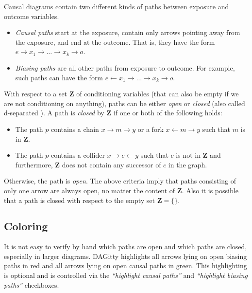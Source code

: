 \documentclass[a4paper]{article} %
\newcommand{\pp}{DAGitty\xspace}
\newcommand{\action}[1]{\emph{``#1''}}
\begin{document}
Causal diagrams contain two different kinds of paths between exposure and outcome
variables.

\begin{itemize}
\item \emph{Causal paths} start at the exposure, contain
only arrows pointing away from the exposure, and end at 
the outcome. That is, they have the form
$e \rightarrow x_1 \rightarrow \ldots \rightarrow x_k \rightarrow o$.
\item \emph{Biasing paths} are all other paths from exposure to outcome. For 
example, such paths can have the form 
$e \leftarrow x_1 \rightarrow \ldots \rightarrow x_k \rightarrow o$.
\end{itemize}

With respect to a set $\mathbf{Z}$ of conditioning variables (that 
can also be empty if we are not conditioning on anything), 
paths can be either \emph{open} or \emph{closed}
(also called d-separated \cite{Pearl2009}). A path 
is \emph{closed} by $\mathbf{Z}$ if one or both of the following holds: 

\begin{itemize}
 \item The path $p$ contains a chain $x \rightarrow m \rightarrow y$ 
 	or a fork $x \leftarrow m \rightarrow y$ 
    such that $m$ is in $\mathbf{Z}$.
 \item The path $p$ contains a collider $x \rightarrow c \leftarrow y$ 
 	such that $c$ is not in $\mathbf{Z}$ and 
    furthermore, $\mathbf{Z}$ does not contain
    any successor of $c$ in the graph. 
\end{itemize}

Otherwise, the path is \emph{open}.
The above criteria imply that paths consisting of only one
arrow are always open, no matter the content of $\mathbf{Z}$. 
Also it is possible that a path is closed with respect
to the empty set $\mathbf{Z}=\{\}$.

\subsection{Coloring}

It is not easy to verify by hand which paths are open and
which paths are closed, especially in larger diagrams. 
\pp highlights all arrows lying on open 
biasing paths in red and all arrows lying on open
causal paths in green. This highlighting is optional 
and is controlled via 
the \action{highlight causal paths} and \action{highlight biasing paths}
checkboxes.
\end{document}
